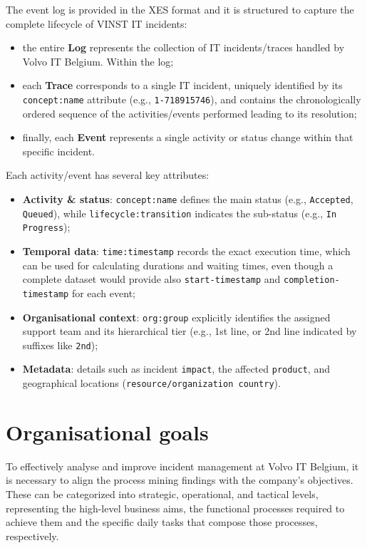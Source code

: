 \documentclass[11pt,a4paper]{article}
\begin{document}
The event log is provided in the XES format and it is structured to capture the complete lifecycle of VINST IT incidents:
\begin{itemize}
    \item the entire \textbf{Log} represents the collection of IT incidents/traces handled by Volvo IT Belgium. Within the log;
    \item each \textbf{Trace} corresponds to a single IT incident, uniquely identified by its \texttt{concept:name} attribute (e.g., \texttt{1-718915746}), and contains the chronologically ordered sequence of the activities/events performed leading to its resolution; \item finally, each \textbf{Event} represents a single activity or status change within that specific incident. 
\end{itemize}
Each activity/event has several key attributes:
\begin{itemize}
    \item \textbf{Activity \& status}: \texttt{concept:name} defines the main status (e.g., \texttt{Accepted}, \texttt{Queued}), while \texttt{lifecycle:transition} indicates the sub-status (e.g., \texttt{In Progress});
    \item \textbf{Temporal data}: \texttt{time:timestamp} records the exact execution time, which can be used for calculating durations and waiting times, even though a complete dataset would provide also \texttt{start-timestamp} and \texttt{completion-timestamp} for each event;
    \item \textbf{Organisational context}: \texttt{org:group} explicitly identifies the assigned support team and its hierarchical tier (e.g., 1st line, or 2nd line indicated by suffixes like \texttt{2nd});
    \item \textbf{Metadata}: details such as incident \texttt{impact}, the affected \texttt{product}, and geographical locations (\texttt{resource/organization country}).
\end{itemize}

\section{Organisational goals}
To effectively analyse and improve incident management at Volvo IT Belgium, it is necessary to align the process mining findings with the company's objectives. These can be categorized into strategic, operational, and tactical levels, representing the high-level business aims, the functional processes required to achieve them and the specific daily tasks that compose those processes, respectively.
\end{document}
